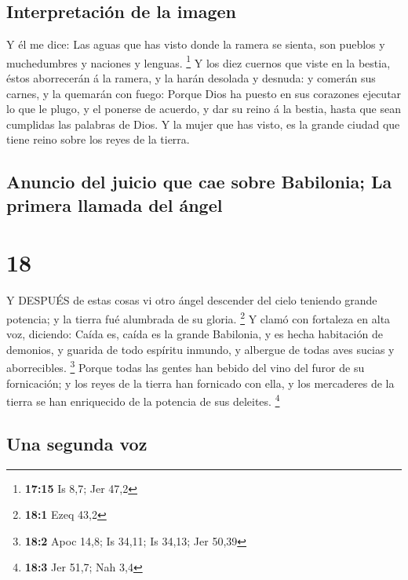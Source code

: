 \hypertarget{interpretaciuxf3n-de-la-imagen}{%
\subsection{Interpretación de la
imagen}\label{interpretaciuxf3n-de-la-imagen}}

 Y él me dice: Las aguas que has visto donde la ramera se
sienta, son pueblos y muchedumbres y naciones y lenguas. \footnote{\textbf{17:15}
  Is 8,7; Jer 47,2}  Y los diez cuernos que viste en la
bestia, éstos aborrecerán á la ramera, y la harán desolada y desnuda: y
comerán sus carnes, y la quemarán con fuego:  Porque Dios
ha puesto en sus corazones ejecutar lo que le plugo, y el ponerse de
acuerdo, y dar su reino á la bestia, hasta que sean cumplidas las
palabras de Dios.  Y la mujer que has visto, es la grande
ciudad que tiene reino sobre los reyes de la tierra.

\hypertarget{anuncio-del-juicio-que-cae-sobre-babilonia-la-primera-llamada-del-uxe1ngel}{%
\subsection{Anuncio del juicio que cae sobre Babilonia; La primera
llamada del
ángel}\label{anuncio-del-juicio-que-cae-sobre-babilonia-la-primera-llamada-del-uxe1ngel}}

\hypertarget{section-17}{%
\section{18}\label{section-17}}

 Y DESPUÉS de estas cosas vi otro ángel descender del cielo
teniendo grande potencia; y la tierra fué alumbrada de su gloria.
\footnote{\textbf{18:1} Ezeq 43,2}  Y clamó con fortaleza en
alta voz, diciendo: Caída es, caída es la grande Babilonia, y es hecha
habitación de demonios, y guarida de todo espíritu inmundo, y albergue
de todas aves sucias y aborrecibles. \footnote{\textbf{18:2} Apoc 14,8;
  Is 34,11; Is 34,13; Jer 50,39}  Porque todas las gentes
han bebido del vino del furor de su fornicación; y los reyes de la
tierra han fornicado con ella, y los mercaderes de la tierra se han
enriquecido de la potencia de sus deleites. \footnote{\textbf{18:3} Jer
  51,7; Nah 3,4}

\hypertarget{una-segunda-voz}{%
\subsection{Una segunda voz}\label{una-segunda-voz}}

